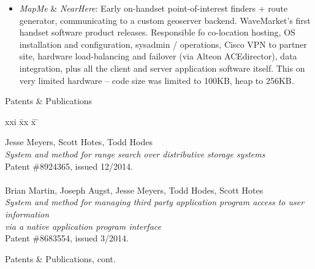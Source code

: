 \begin{itemize}
  		\item {\em MapMe} \& {\em NearHere}:
		Early on-handset point-of-interest finders + route generator, communicating to a custom geoserver
		backend. WaveMarket's first handset software product releases. Responsible fo co-location hosting,
		OS installation and configuration, sysadmin / operations, Cisco VPN to partner site, hardware load-balancing
		and failover (via Alteon ACEdirector), data integration, plus all the client and server application software itself.
		This on very limited hardware -- code size was limited to 100KB, heap to 256KB.
		
	\end{itemize}


\bigskip
\bigskip

\begin{bf} \large
Patents \& Publications
\end{bf}
\begin{tabbing}
xxi \= xx \= x \= \kill

\>    Jesse Meyers, Scott Hotes, Todd Hodes \\
\>\>      {\it System and method for range search over distributive storage systems} \\
\>\>    Patent \#8924365, issued 12/2014. \\

\smallskip \\[-3pt]
\>    Brian Martin, Joseph Augst, Jesse Meyers, Todd Hodes, Scott Hotes \\
\>\>      {\it System and method for managing third party application program access to user information} \\
\>\>      {\it via a native application program interface} \\
\>\>    Patent \#8683554, issued 3/2014. \\

\end{tabbing}
\newpage
\begin{bf} \large
Patents \& Publications, cont.
\end{bf}
